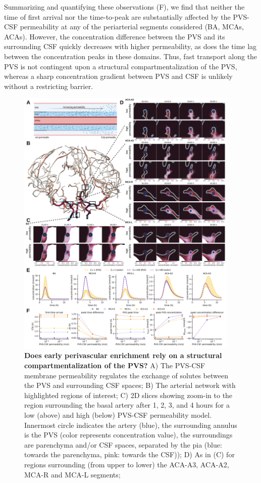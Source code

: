 \documentclass[fleqn,10pt]{wlscirep}
\begin{document}
Summarizing and quantifying these observations
(F), we find that neither the time of
first arrival nor the time-to-peak are substantially affected by the
PVS-CSF permeability at any of the periarterial segments considered
(BA, MCAs, ACAs). However, the concentration difference between the
PVS and its surrounding CSF quickly decreases with higher
permeability, as does the time lag between the concentration peaks in
these domains. Thus, fast transport along the PVS is not contingent
upon a structural compartmentalization of the PVS, whereas a sharp
concentration gradient between PVS and CSF is unlikely without a
restricting barrier.
\begin{figure}
    \centering
    \includegraphics[width=0.95\textwidth]{figures/figure4.png}
    \caption{\textbf{Does early perivascular enrichment rely on a structural compartmentalization of the PVS?}
    A) The PVS-CSF membrane permeability regulates the exchange of solutes between the PVS and surrounding CSF spaces; 
    B) The arterial network with highlighted regions of interest; 
    C) 2D slices showing zoom-in to the region surrounding the basal artery after 1, 2, 3, and 4 hours for a low (above) and high (below) PVS-CSF permeability model. Innermost circle indicates the artery (blue), the surrounding annulus is the PVS (color represents concentration value), the surroundings are parenchyma and/or CSF spaces, separated by the pia (blue: towards the parenchyma, pink: towards the CSF));
    D) As in (C) for regions surrounding (from upper to lower) the ACA-A3, ACA-A2, MCA-R and MCA-L segments;}
    \label{fig:compartmentalization}
\end{figure}
\end{document}
